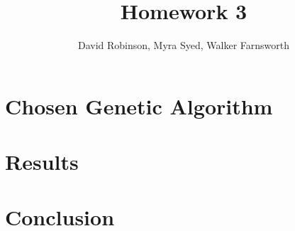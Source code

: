 \documentclass{article}
\title{Homework 3}
\author{David Robinson, Myra Syed, Walker Farnsworth}
\date{}
\begin{document}
\maketitle

\section*{Chosen Genetic Algorithm}

\section*{Results}

\section*{Conclusion}
\end{document}
